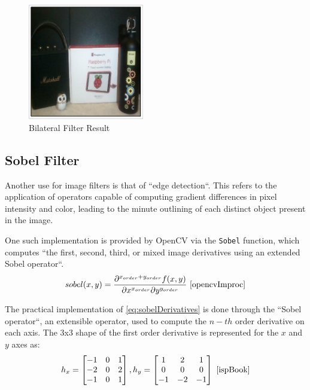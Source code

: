 \begin{figure}[H]
	\includegraphics[width=0.45\textwidth, height=0.45\textwidth]{resources/Bilateral_2.png}
	\caption{Bilateral Filter Result}
\end{figure}

\subsection{Sobel Filter}

Another use for image filters is that of ``edge detection``. This refers to the application of operators
capable  of computing gradient differences in pixel intensity and color, leading to the minute outlining of
each distinct object present in the image.

One such implementation is provided by OpenCV via the \verb|Sobel| function, which computes ``the first,
second, third, or mixed image derivatives using an extended Sobel operator``.
\begin{equation}
	\label{eq:sobelDerivatives}
	sobel(x, y) =
	{{\partial^{x_{order}+y_{order}}f(x, y)}\over{\partial x^{x_{order}} \partial y^{y_{order}}}}
	\text{ \cite{opencvImproc}}
\end{equation}

The practical implementation of \cref{eq:sobelDerivatives} is done through the ``Sobel operator``, an
extensible operator, used to compute the \(n-th\) order derivative on each axis. The 3x3 shape of the
first order derivative is represented for the \(x\) and \(y\) axes as:
\begin{equation}
	\label{eq:sobelOperators}
	h_x =
	\begin{bmatrix}
		-1 & 0 & 1 \\
		-2 & 0 & 2 \\
		-1 & 0 & 1 \\
	\end{bmatrix}
	,
	h_y =
	\begin{bmatrix}
		1  & 2  & 1  \\
		0  & 0  & 0  \\
		-1 & -2 & -1 \\
	\end{bmatrix}
	\text{ \cite{ispBook}}
\end{equation}

